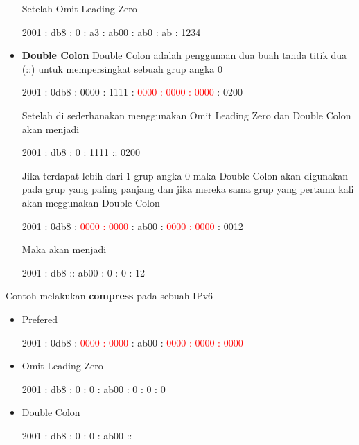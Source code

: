 \documentclass{article}
\begin{document}
\begin{flushleft}
\begin{itemize}
            Setelah Omit Leading Zero
            \begin{center}
                2001 : db8 : 0 : a3 : ab00 : ab0 : ab : 1234
            \end{center}

            \item[] \textbf{Double Colon} \newline
            Double Colon adalah penggunaan dua buah tanda titik dua (::) untuk mempersingkat sebuah grup angka 0
            \begin{center}
                2001 : 0db8 : 0000 : 1111 : \textcolor{red}{0000 : 0000 : 0000} : 0200
            \end{center}

            Setelah di sederhanakan menggunakan Omit Leading Zero dan Double Colon akan menjadi
            \begin{center}
                2001 : db8 : 0 : 1111 :: 0200
            \end{center}

            Jika terdapat lebih dari 1 grup angka 0 maka Double Colon akan digunakan pada grup yang paling panjang dan jika mereka sama grup yang pertama kali akan meggunakan Double Colon
            \begin{center}
                2001 : 0db8 : \textcolor{red}{0000 : 0000} : ab00 : \textcolor{red}{0000 : 0000} : 0012
            \end{center}

            Maka akan menjadi
            \begin{center}
                2001 : db8 :: ab00 : 0 : 0 : 12 
            \end{center}
        \end{itemize}
        \newpage
        
        Contoh melakukan \textbf{compress} pada sebuah IPv6
        \begin{itemize}
            \item[] Prefered
            \begin{center}
                2001 : 0db8 : \textcolor{red}{0000 : 0000} : ab00 : \textcolor{red}{0000 : 0000 : 0000}
            \end{center}
            \item[] Omit Leading Zero
            \begin{center}
                2001 : db8 : 0 : 0 : ab00 : 0 : 0 : 0
            \end{center}
            \item[] Double Colon
            \begin{center}
                2001 : db8 : 0 : 0 : ab00 ::
            \end{center}
        \end{itemize}
    \end{flushleft}
\end{document}
